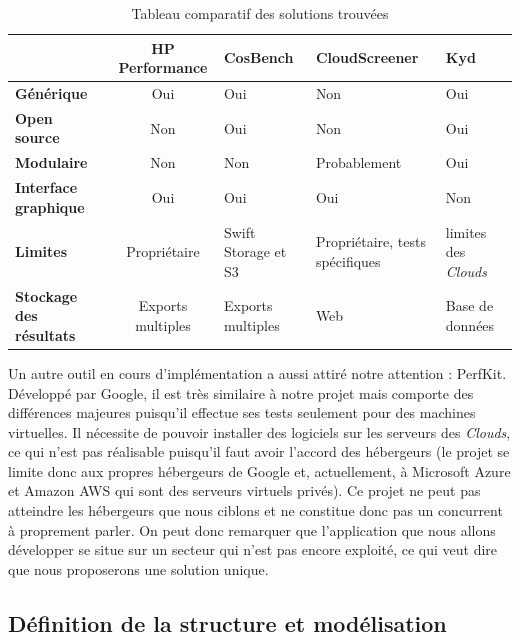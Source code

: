 \documentclass[10pt]{article}
\begin{document}
\begin{table}[h] \caption{Tableau comparatif des solutions trouvées}
\renewcommand{\arraystretch}{1.5} \begin{center}
\begin{tabular}{|p{2cm}|c|p{2cm}|p{3cm}|p{2cm}|} \hline & \bf HP Performance &
\bf CosBench & \bf CloudScreener & \bf Kyd  \\ \hline \bf\centering Générique &
Oui & Oui & Non & Oui \\ \hline \bf\centering Open source & Non & Oui & Non &
Oui \\ \hline \bf\centering Modulaire & Non & Non & Probablement & Oui \\ \hline
\bf\centering Interface graphique & Oui & Oui & Oui & Non \\ \hline
\bf\centering Limites & Propriétaire & Swift Storage et S3 & Propriétaire, tests
spécifiques & limites des \textit{Clouds} \\ \hline \bf\centering Stockage des
résultats & Exports multiples & Exports multiples & Web & Base de données \\
\hline \end{tabular} \end{center} \end{table}

Un autre outil en cours d'implémentation a aussi attiré notre
attention : PerfKit. Développé par Google, il est très similaire à
notre projet mais comporte des différences majeures puisqu'il effectue
ses tests seulement pour des machines virtuelles. Il nécessite de
pouvoir installer des logiciels sur les serveurs des \textit{Clouds}, ce qui
n'est pas réalisable puisqu'il faut avoir l'accord des hébergeurs (le
projet se limite donc aux propres hébergeurs de Google et,
actuellement, à Microsoft Azure et Amazon AWS qui sont des serveurs
virtuels privés). Ce projet ne peut pas atteindre les hébergeurs que
nous ciblons et ne constitue donc pas un concurrent à proprement
parler. On peut donc remarquer que l’application que nous allons
développer se situe sur un secteur qui n’est pas encore exploité, ce
qui veut dire que nous proposerons une solution unique.

\subsection{Définition de la structure et modélisation}
\end{document}
